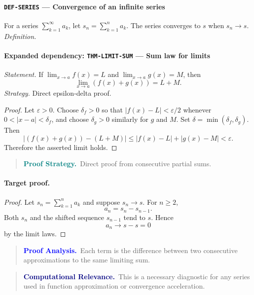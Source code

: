 \documentclass[10pt]{article}
\newcommand{\pidraw}[1]{\begingroup\urlstyle{tt}\nolinkurl{#1}\endgroup}
\theoremstyle{definition}
\theoremstyle{remark}
\newenvironment{proofstrategy}
{\begin{quote}\small\noindent\textbf{\textcolor{teal}{Proof Strategy.}}\ }
{\end{quote}}
\newenvironment{proofanalysis}
{\begin{quote}\small\noindent\textbf{\textcolor{blue}{Proof Analysis.}}\ }
{\end{quote}}
\newenvironment{computationalrelevance}
{\begin{quote}\small\noindent\textbf{\textcolor{navy}{Computational Relevance.}}\ }
{\end{quote}}
\begin{document}
\paragraph{\pidraw{DEF-SERIES} --- Convergence of an infinite series}
For a series $\sum_{k=1}^{\infty}a_k$, let $s_n=\sum_{k=1}^n a_k$. The series converges to $s$ when $s_n\to s$.
\textit{Definition.}

\paragraph{Expanded dependency: \pidraw{THM-LIMIT-SUM} --- Sum law for limits}
\textit{Statement.} If $\lim_{x\to a}f(x)=L$ and $\lim_{x\to a}g(x)=M$, then
\[
\lim_{x\to a}(f(x)+g(x))=L+M.
\]
\textit{Strategy.} Direct epsilon-delta proof.
\begin{proof}Let $\varepsilon>0$. Choose $\delta_f>0$ so that
$|f(x)-L|<\varepsilon/2$ whenever $0<|x-a|<\delta_f$, and choose
$\delta_g>0$ similarly for $g$ and $M$. Set
$\delta=\min(\delta_f,\delta_g)$. Then
\[
|(f(x)+g(x))-(L+M)|
\le |f(x)-L|+|g(x)-M|<\varepsilon.
\]
Therefore the asserted limit holds.\end{proof}

\begin{proofstrategy}Direct proof from consecutive partial sums.\end{proofstrategy}

\paragraph{Target proof.}

\begin{proof}

Let $s_n=\sum_{k=1}^{n}a_k$ and suppose $s_n\to s$. For $n\ge2$,
\[
a_n=s_n-s_{n-1}.
\]
Both $s_n$ and the shifted sequence $s_{n-1}$ tend to $s$. Hence
\[
a_n\to s-s=0
\]
by the limit laws.

\end{proof}

\begin{proofanalysis}Each term is the difference between two consecutive approximations to the same limiting sum.\end{proofanalysis}

\begin{computationalrelevance}This is a necessary diagnostic for any series used in function approximation or convergence acceleration.\end{computationalrelevance}
\end{document}

